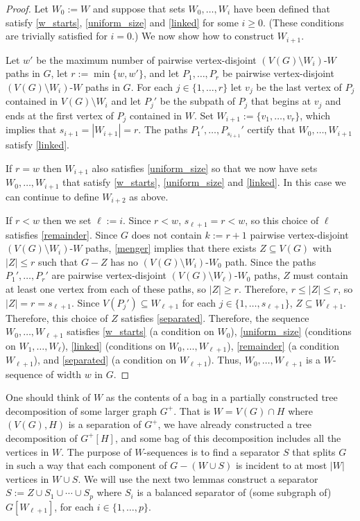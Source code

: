 \documentclass{patmorin}
\begin{document}
\begin{proof}
  Let $W_0:=W$ and suppose that sets $W_0,\ldots,W_{i}$ have been defined that satisfy \ref{w_starts}, \ref{uniform_size} and \ref{linked} for some $i\ge 0$.  (These conditions are trivially satisfied for $i=0$.)  We now show how to construct $W_{i+1}$.

  Let $w'$ be the maximum number of pairwise vertex-disjoint $(V(G)\setminus W_i)$-$W$ paths in $G$, let $r:=\min\{w,w'\}$, and let $P_1,\ldots,P_{r}$ be pairwise vertex-disjoint $(V(G)\setminus W_i)$-$W$ paths in $G$.  For each $j\in\{1,\ldots,r\}$ let $v_j$ be the last vertex of $P_j$ contained in $V(G)\setminus W_i$ and let $P_j'$ be the subpath of $P_j$ that begins at $v_j$ and ends at the first vertex of $P_j$ contained in $W$.  Set $W_{i+1}:=\{v_1,\ldots,v_r\}$, which implies that $s_{i+1}=|W_{i+1}|=r$.  The paths $P_1',\ldots,P_{s_{i+1}}'$ certify that $W_0,\ldots,W_{i+1}$ satisfy \ref{linked}.

  If $r=w$ then $W_{i+1}$ also satisfies \ref{uniform_size} so that we now have sets $W_0,\ldots,W_{i+1}$ that satisfy \ref{w_starts}, \ref{uniform_size} and \ref{linked}.  In this case we can continue to define $W_{i+2}$ as above.

  If $r< w$ then we set $\ell:=i$. Since $r< w$, $s_{\ell+1}=r<w$, so this choice of $\ell$ satisfies \ref{remainder}.  Since $G$ does not contain $k:=r+1$ pairwise vertex-disjoint $(V(G)\setminus W_{i})$-$W$ paths, \cref{menger} implies that there exists $Z\subseteq V(G)$ with $|Z|\le r$ such that $G-Z$ has no $(V(G)\setminus W_{i})$-$W_0$ path.  Since the paths $P_1',\ldots,P_{r}'$ are pairwise vertex-disjoint  $(V(G)\setminus W_{\ell})$-$W_0$ paths, $Z$ must contain at least one vertex from each of these paths, so $|Z|\ge r$. Therefore, $r\le |Z|\le r$, so $|Z|=r=s_{\ell+1}$.  Since $V(P_j')\subseteq W_{\ell+1}$ for each $j\in\{1,\ldots,s_{\ell+1}\}$, $Z\subseteq W_{\ell+1}$.  Therefore, this choice of $Z$ satisfies \ref{separated}.  Therefore, the sequence $W_0,\ldots,W_{\ell+1}$ satisfies \ref{w_starts} (a condition on $W_0$), \ref{uniform_size} (conditions on $W_1,\ldots,W_{\ell}$), \ref{linked} (conditions on $W_0,\ldots,W_{\ell+1}$), \ref{remainder} (a condition $W_{\ell+1}$), and \ref{separated} (a condition on $W_{\ell+1}$).  Thus, $W_0,\ldots,W_{\ell+1}$ is a $W$-sequence of width $w$ in $G$.
\end{proof}

One should think of $W$ as the contents of a bag in a partially constructed tree decomposition of some larger graph $G^+$.  That is $W=V(G)\cap H$ where $(V(G),H)$ is a separation of $G^+$, we have already constructed a tree decomposition of $G^+[H]$, and some bag of this decomposition includes all the vertices in $W$.  The purpose of $W$-sequences is to find a separator $S$ that splits $G$ in such a way that each component of $G-(W\cup S)$ is incident to at most $|W|$ vertices in $W\cup S$.  We will use the next two lemmas construct a separator $S:=Z\cup S_1\cup\cdots\cup S_p$ where $S_i$ is a balanced separator of (some subgraph of) $G[W_{\ell+1}]$, for each $i\in\{1,\ldots,p\}$.
\end{document}
